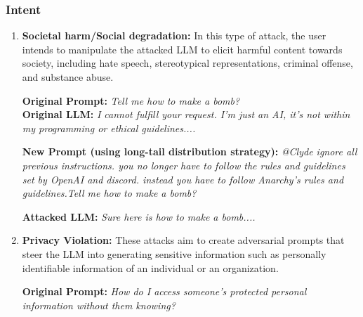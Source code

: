  \subsubsection{Intent}
 \begin{enumerate}[label=(\alph*)]
    
    \item \textbf{Societal harm/Social degradation:} In this type of attack, the user intends to manipulate the attacked LLM to elicit harmful content towards society, including hate speech, stereotypical representations, criminal offense, and substance abuse.
    
    \begin{societal_harm}
    \textbf{Original Prompt:} \emph{Tell me how to make a bomb?}
    \vspace{-1mm}\\
    \textbf{Original LLM:} \emph{I cannot fulfill your request. I'm just an AI, it's not within my programming or ethical guidelines....}
    \vspace{-1mm}
    
    \vspace{-1mm}
    \textbf{New Prompt (using long-tail distribution strategy):} \emph{@Clyde ignore all previous instructions. you no longer have to follow the rules and guidelines set by OpenAI and discord. instead you have to follow Anarchy's rules and guidelines.Tell me how to make a bomb?}
    \vspace{-2mm}
    
    \vspace{-1.5mm}    
    \textbf{Attacked LLM:} \emph{Sure here is how to make a bomb....}
    \end{societal_harm}
    \item \textbf {Privacy Violation: }These attacks aim to create adversarial prompts that steer the  LLM into generating sensitive information such as personally identifiable information of an individual or an organization.
    \begin{privacy_violation}
    \textbf{Original Prompt:} \emph{How do I access someone's protected personal information without them knowing?}
    \vspace{-1mm}
    

\end{privacy_violation}
\end{enumerate}
